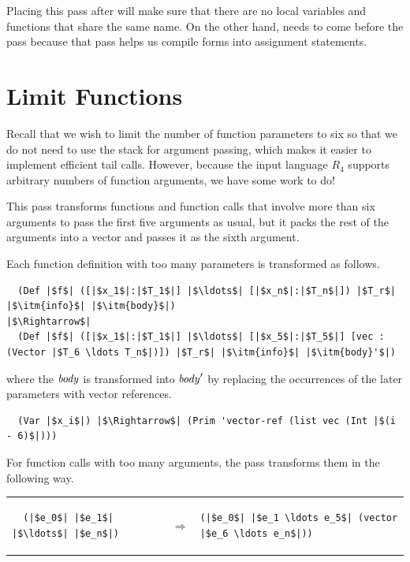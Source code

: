 \documentclass[11pt]{book}
\begin{document}

Placing this pass after  will make sure that there are
no local variables and functions that share the same name. On the
other hand,  needs to come before the
 pass because that pass helps us compile
 forms into assignment statements.

\section{Limit Functions}
\label{sec:limit-functions-r4}

Recall that we wish to limit the number of function parameters to six
so that we do not need to use the stack for argument passing, which
makes it easier to implement efficient tail calls.  However, because
the input language $R_4$ supports arbitrary numbers of function
arguments, we have some work to do!

This pass transforms functions and function calls that involve more
than six arguments to pass the first five arguments as usual, but it
packs the rest of the arguments into a vector and passes it as the
sixth argument.

Each function definition with too many parameters is transformed as
follows.
\begin{lstlisting}
  (Def |$f$| ([|$x_1$|:|$T_1$|] |$\ldots$| [|$x_n$|:|$T_n$|]) |$T_r$| |$\itm{info}$| |$\itm{body}$|) 
|$\Rightarrow$|
  (Def |$f$| ([|$x_1$|:|$T_1$|] |$\ldots$| [|$x_5$|:|$T_5$|] [vec : (Vector |$T_6 \ldots T_n$|)]) |$T_r$| |$\itm{info}$| |$\itm{body}'$|) 
\end{lstlisting}
where the $\mathit{body}$ is transformed into $\mathit{body}'$ by replacing
the occurrences of the later parameters with vector references.
\begin{lstlisting}
  (Var |$x_i$|) |$\Rightarrow$| (Prim 'vector-ref (list vec (Int |$(i - 6)$|)))
\end{lstlisting}

For function calls with too many arguments, the 
pass transforms them in the following way.

\begin{tabular}{lll}
\begin{minipage}{0.2\textwidth}
\begin{lstlisting}
  (|$e_0$| |$e_1$| |$\ldots$| |$e_n$|) 
\end{lstlisting}
\end{minipage}
&
$\Rightarrow$
&
\begin{minipage}{0.4\textwidth}
\begin{lstlisting}
(|$e_0$| |$e_1 \ldots e_5$| (vector |$e_6 \ldots e_n$|))
\end{lstlisting}
\end{minipage}
\end{tabular}
\end{document}
